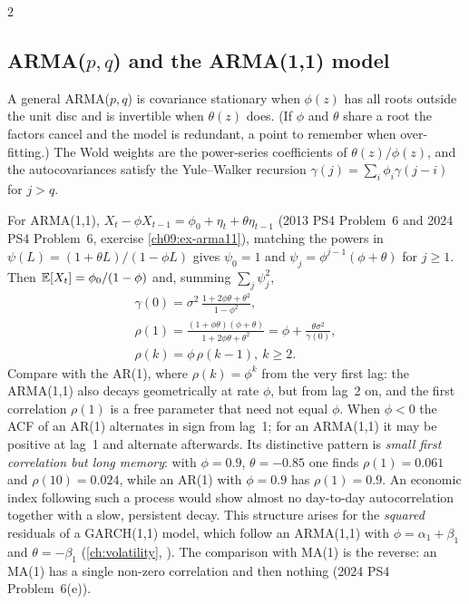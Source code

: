 \begin{paracol}{2}
\subsection{ARMA($p,q$) and the ARMA(1,1) model}\label{ch09:sec-arma11}
A general ARMA($p,q$) is covariance stationary when $\phi(z)$ has all roots outside the unit disc and is invertible when
$\theta(z)$ does. (If $\phi$ and $\theta$ share a root the factors cancel and the model is redundant, a point to remember
when over-fitting.) The Wold weights are the power-series coefficients of $\theta(z)/\phi(z)$, and the
autocovariances satisfy the Yule--Walker recursion $\gamma(j)=\sum_i\phi_i\gamma(j-i)$ for $j>q$.

For ARMA(1,1), $X_t-\phi X_{t-1}=\phi_0+\eta_t+\theta\eta_{t-1}$ (2013 PS4 Problem~6 and 2024 PS4 Problem~6,
exercise \ref{ch09:ex-arma11}), matching the powers in $\psi(L)=(1+\theta L)/(1-\phi L)$ gives
$\psi_0=1$ and $\psi_j=\phi^{j-1}(\phi+\theta)$ for $j\ge1$. Then $\mathbb{E}[X_t]=\phi_0/(1-\phi)$ and, summing $\sum_j\psi_j^2$,
\begin{equation}\label{ch09:eq-arma11}\begin{gathered}
  \gamma(0)=\sigma^2\,\frac{1+2\phi\theta+\theta^2}{1-\phi^2},\\
  \rho(1)=\frac{(1+\phi\theta)(\phi+\theta)}{1+2\phi\theta+\theta^2}=\phi+\frac{\theta\sigma^2}{\gamma(0)},\\
  \rho(k)=\phi\,\rho(k-1),\ k\ge2 .
\end{gathered}\end{equation}
Compare with the AR(1), where $\rho(k)=\phi^k$ from the very first lag: the ARMA(1,1) also decays geometrically at
rate $\phi$, but from lag~2 on, and the first correlation $\rho(1)$ is a free parameter that need not equal $\phi$. When
$\phi<0$ the ACF of an AR(1) alternates in sign from lag~1; for an ARMA(1,1) it may be positive at lag~1 and alternate
afterwards. Its distinctive pattern is \emph{small first correlation but long memory}: with $\phi=0.9$,
$\theta=-0.85$ one finds $\rho(1)=0.061$ and $\rho(10)=0.024$, while an AR(1) with $\phi=0.9$ has $\rho(1)=0.9$. An economic
index following such a process would show almost no day-to-day autocorrelation together with a slow, persistent
decay. This structure arises for the \emph{squared} residuals of a GARCH(1,1) model, which follow an ARMA(1,1) with
$\phi=\alpha_1+\beta_1$ and $\theta=-\beta_1$ (\cref{ch:volatility}, ).
The comparison with MA(1) is the reverse: an MA(1) has a single non-zero correlation and then nothing
(2024 PS4 Problem~6(e)).


\end{paracol}
